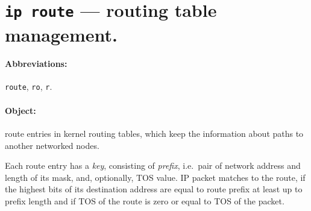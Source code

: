 \section{{\tt ip route} --- routing table management.}
\label{IP-ROUTE}

\paragraph{Abbreviations:} \verb|route|, \verb|ro|, \verb|r|.

\paragraph{Object:} route entries in kernel routing tables, which keep
the information about paths to another networked nodes.

Each route entry has a {\em key\/}, consisting of {\em prefix\/},
i.e.\ pair of network address and length of its mask, and,
optionally, TOS value. IP packet matches to the route, if the highest
bits of its destination address are equal to route prefix at least
up to prefix length and if TOS of the route is zero or equal to
TOS of the packet.
 
